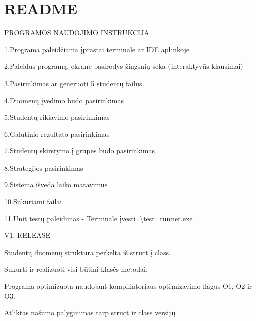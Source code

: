 \chapter{README}
\hypertarget{md_README}{}\label{md_README}
PROGRAMOS NAUDOJIMO INSTRUKCIJA

1.\+Programa paleidžiama įprastai terminale ar IDE aplinkoje

2.\+Paleidus programą, ekrane pasirodys žingsnių seka (interaktyvūs klausimai)

3.\+Pasirinkimas ar generuoti 5 studentų failus

4.\+Duomenų įvedimo būdo pasirinkimas

5.\+Studentų rikiavimo pasirinkimas

6.\+Galutinio rezultato pasirinkimas

7.\+Studentų skirstymo į grupes būdo pasirinkimas

8.\+Strategijos pasirinkimas

9.\+Sistema išveda laiko matavimus

10.\+Sukuriami failai.

11.\+Unit testų paleidimas -\/ Terminale įvesti .\textbackslash{}test\+\_\+runner.exe

V1. RELEASE

Studentų duomenų struktūra perkelta iš struct į class.

Sukurti ir realizuoti visi būtini klasės metodai.

Programa optimizuota naudojant kompiliatoriaus optimizavimo flagus O1, O2 ir O3.

Atliktas našumo palyginimas tarp struct ir class versijų 